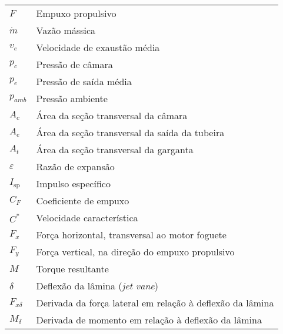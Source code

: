 \begin{longtable}{ll}
\(F\) & Empuxo propulsivo \\
\(\dot{m}\) & Vazão mássica \\
\(v_e\) & Velocidade de exaustão média \\
\(p_c\) & Pressão de câmara \\
\(p_e\) & Pressão de saída média \\
\(p_{amb}\) & Pressão ambiente \\
\(A_c\) & Área da seção transversal da câmara \\
\(A_e\) & Área da seção transversal da saída da tubeira \\
\(A_t\) & Área da seção transversal da garganta \\
\(\varepsilon \) & Razão de expansão \\
\(I_{\mathrm{sp}}\) & Impulso específico \\
\(C_F\) & Coeficiente de empuxo \\
\(C^*\) & Velocidade característica \\
\(F_x\) & Força horizontal, transversal ao motor foguete \\
\(F_y\) & Força vertical, na direção do empuxo propulsivo \\
\(M\) & Torque resultante \\
\(\delta \) & Deflexão da lâmina (\textit{jet vane}) \\
\(F_{x\delta}\) & Derivada da força lateral em relação à deflexão da lâmina \\
\(M_\delta \) & Derivada de momento em relação à deflexão da lâmina
\end{longtable}

